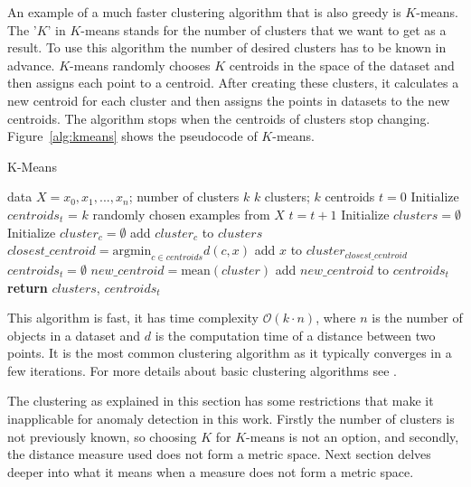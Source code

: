 \documentclass[thesis=B,english]{FITthesis}[2012/10/20]
\begin{document}
An example of a much faster clustering algorithm that is also greedy is $K$-means.
The '$K$' in $K$-means stands for the number of clusters that we want to get as a result.
To use this algorithm the number of desired clusters has to be known in advance.
$K$-means randomly chooses $K$ centroids in the space of the dataset and then assigns each point to a centroid.
After creating these clusters, it calculates a new centroid for each cluster and then assigns the points in datasets to the new centroids.
The algorithm stops when the centroids of clusters stop changing.
Figure~\ref{alg:kmeans} shows the pseudocode of $K$-means.
\begin{algorithm}[H]\label{alg:kmeans}
    \caption{K-Means}
    \label{k_mean_pseudocode}
    \begin{algorithmic}[1]
        \INPUT data $X = x_0, x_1, ..., x_n$; number of clusters $k$
        \OUTPUT $k$ clusters; $k$ centroids
        \STATE $t = 0$
        \STATE Initialize $centroids_t$ = $k$ randomly chosen examples from $X$
        \DO
            \STATE $t = t + 1$
            \STATE Initialize $clusters = \emptyset$
                \STATE Initialize $cluster_c = \emptyset$
                \STATE add $cluster_c$ to $clusters$
            \ENDFOR
                \STATE $closest\_centroid = \mathrm{argmin}_{c \in centroids} d(c, x)$
                \STATE add $x$ to $cluster_{closest\_centroid}$
            \ENDFOR
            \STATE $centroids_t = \emptyset$
                \STATE $new\_centroid  = \mathrm{mean}(cluster)$
                \STATE add $new\_centroid$ to $centroids_t$
            \ENDFOR
        \STATE \textbf{return} $clusters$, $centroids_t$

    \end{algorithmic}
\end{algorithm} 

This algorithm is fast, it has time complexity $\mathcal{O}(k \cdot n)$, where $n$ is the number of objects in a dataset and $d$ is the computation time of a distance between two points.
It is the most common clustering algorithm as it typically converges in a few iterations.
For more details about basic clustering algorithms see \cite{guttag2016introduction}.

The clustering as explained in this section has some restrictions that make it inapplicable for anomaly detection in this work.
Firstly the number of clusters is not previously known, so choosing $K$ for $K$-means is not an option, and secondly, the distance measure used does not form a metric space.
Next section delves deeper into what it means when a measure does not form a metric space.
\end{document}

